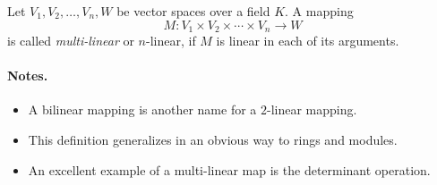 \documentclass[12pt]{article}
\begin{document}
Let $V_1, V_2,\ldots, V_n, W$ be vector spaces over a field $K$.  A
mapping $$M: V_1\times V_2\times \cdots \times V_n \rightarrow W$$ is
called {\em multi-linear} or $n$-linear, if $M$ is linear in each of
its arguments.

\paragraph{Notes.}
\begin{itemize}
\item  A bilinear mapping is another name for a $2$-linear mapping.
\item This definition generalizes in an obvious way to rings and
  modules.
\item An excellent example of a multi-linear map is the determinant operation.
 \end{itemize}
\end{document}
